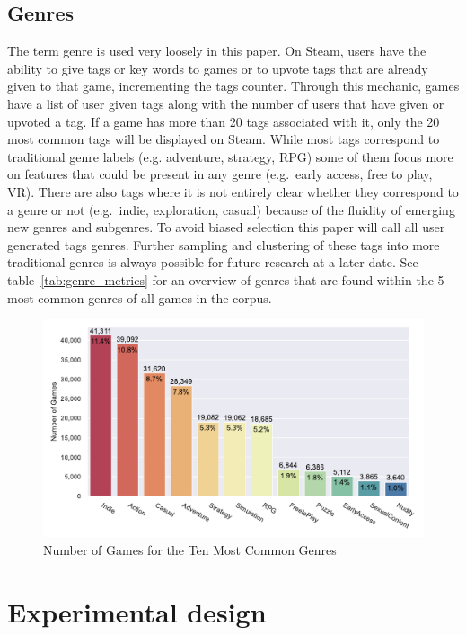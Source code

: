 \documentclass[11pt, a4paper]{article}
\begin{document}
\subsection{Genres}\label{subsec:genres}
The term genre is used very loosely in this paper.
On Steam, users have the ability to give tags or key words to games or to upvote tags that are already given to that
game, incrementing the tags counter.
Through this mechanic, games have a list of user given tags along with the number of users that have given or upvoted
a tag.
If a game has more than 20 tags associated with it, only the 20 most common tags will be displayed on Steam.
While most tags correspond to traditional genre labels (e.g. adventure, strategy, RPG) some of them focus more on
features that could be present in any genre (e.g.\ early access, free to play, VR). There are also tags where it is
not entirely clear whether they correspond to a genre or not (e.g.\ indie, exploration, casual) because of the fluidity
of emerging new genres and subgenres.
To avoid biased selection this paper will call all user generated tags genres.
Further sampling and clustering of these tags into more traditional genres is always possible for future research at a
later date.
See table~\ref{tab:genre_metrics} for an overview of genres that are found within the 5 most common genres of all games
in the corpus.

\begin{figure}
    \centering
    \includegraphics[width=\textwidth]{data/results/plots/tags_plot}
    \caption{Number of Games for the Ten Most Common Genres}
    \label{fig:tags_fig}
\end{figure}





\section{Experimental design}\label{sec:experimental-design}
\end{document}
